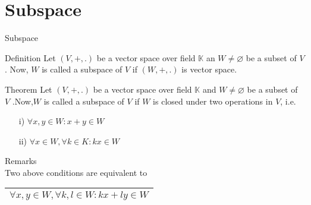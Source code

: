 \documentclass[pdf]{beamer}
\begin{document}
\section{Subspace}
\begin{frame}{Subspace}
\setlength{\textwidth}{11.2cm}
    \begin{block}{Definition}
    Let $(V,+,.)$ be a vector space over field $\mathbb{K}$ an $W\neq\varnothing$ be a subset of $V$. Now, $W$ is called a subspace of $V$ if $(W,+,.)$ is vector space. 
    \end{block}
    \begin{block}{Theorem}
    Let $(V,+,.)$ be a vector space over field $\mathbb{K}$ and $W\neq\varnothing$ be a subset of $V$ .Now,$W$ is called a subspace of $V$ if $W$ is closed under two operations in $V$, i.e.
    \begin{itemize}
        \item[i)] $\forall x,y \in W: x+y \in W$
        \item[ii)] $\forall x \in W, \forall k \in K: kx \in W$
    \end{itemize}
    \end{block}
    Remarks\\
    Two above conditions are equivalent to\\
    \begin{table}
    \centering
    \begin{tabular}{|c|}
         \hline
         $\forall x,y \in W, \forall k,l \in W: kx+ly \in W$\\
         \hline
    \end{tabular}
    \end{table}
\end{frame}
\end{document}
